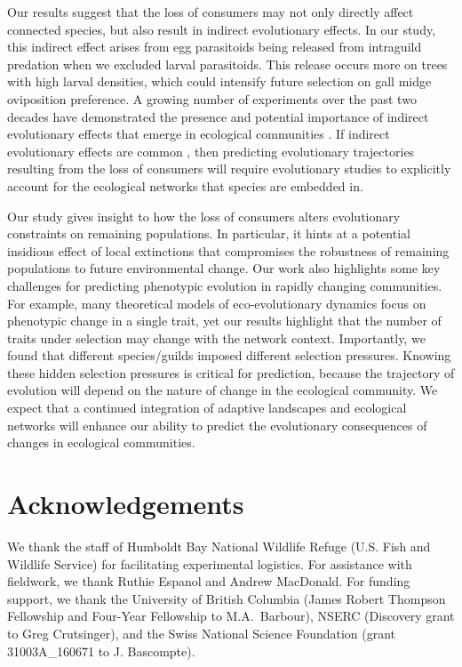 \documentclass[11pt,]{article}
\begin{document}
Our results suggest that the loss of consumers may not only directly
affect connected species, but also result in indirect evolutionary
effects. In our study, this indirect effect arises from egg parasitoids
being released from intraguild predation when we excluded larval
parasitoids. This release occurs more on trees with high larval
densities, which could intensify future selection on gall midge
oviposition preference. A growing number of experiments over the past
two decades have demonstrated the presence and potential importance of
indirect evolutionary effects that emerge in ecological communities
\citep{Pilson1996, Juenger1998, Stinchcombe2001, Lankau2007, Walsh2008, Walsh2010, terHorst2010, Sahli2011, Lau2012, terHorst2015, Schiestl2018, Start2019}.
If indirect evolutionary effects are common
\citep{Miller1996, Walsh2013, Guimaraes2017}, then predicting
evolutionary trajectories resulting from the loss of consumers will
require evolutionary studies to explicitly account for the ecological
networks that species are embedded in.

Our study gives insight to how the loss of consumers alters evolutionary
constraints on remaining populations. In particular, it hints at a
potential insidious effect of local extinctions that compromises the
robustness of remaining populations to future environmental change. Our
work also highlights some key challenges for predicting phenotypic
evolution in rapidly changing communities. For example, many theoretical
models of eco-evolutionary dynamics focus on phenotypic change in a
single trait, yet our results highlight that the number of traits under
selection may change with the network context. Importantly, we found
that different species/guilds imposed different selection pressures.
Knowing these hidden selection pressures is critical for prediction,
because the trajectory of evolution will depend on the nature of change
in the ecological community. We expect that a continued integration of
adaptive landscapes and ecological networks will enhance our ability to
predict the evolutionary consequences of changes in ecological
communities.

\section{Acknowledgements}\label{acknowledgements}

We thank the staff of Humboldt Bay National Wildlife Refuge (U.S. Fish
and Wildlife Service) for facilitating experimental logistics. For
assistance with fieldwork, we thank Ruthie Espanol and Andrew MacDonald.
For funding support, we thank the University of British Columbia (James
Robert Thompson Fellowship and Four-Year Fellowship to M.A.~Barbour),
NSERC (Discovery grant to Greg Crutsinger), and the Swiss National
Science Foundation (grant 31003A\_160671 to J. Bascompte).
\end{document}
